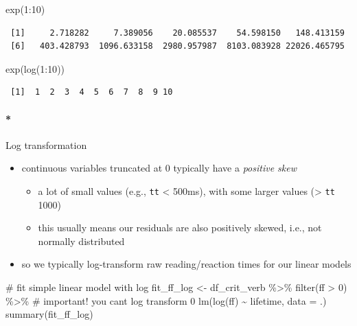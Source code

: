 \documentclass[
  letterpaper,
  DIV=11,
  numbers=noendperiod]{scrartcl}
\let\oldparagraph\paragraph
\renewcommand{\paragraph}[1]{\oldparagraph{#1}\mbox{}}
\newenvironment{Shaded}{\begin{snugshade}}{\end{snugshade}}
\newcommand{\AttributeTok}[1]{\textcolor[rgb]{0.40,0.45,0.13}{#1}}
\newcommand{\CommentTok}[1]{\textcolor[rgb]{0.37,0.37,0.37}{#1}}
\newcommand{\DecValTok}[1]{\textcolor[rgb]{0.68,0.00,0.00}{#1}}
\newcommand{\FunctionTok}[1]{\textcolor[rgb]{0.28,0.35,0.67}{#1}}
\newcommand{\NormalTok}[1]{\textcolor[rgb]{0.00,0.23,0.31}{#1}}
\newcommand{\OtherTok}[1]{\textcolor[rgb]{0.00,0.23,0.31}{#1}}
\newcommand{\SpecialCharTok}[1]{\textcolor[rgb]{0.37,0.37,0.37}{#1}}
\providecommand{\tightlist}{%
  \setlength{\itemsep}{0pt}\setlength{\parskip}{0pt}}\usepackage{longtable,booktabs,array}
\begin{document}
\begin{Shaded}
\begin{Highlighting}[]
\FunctionTok{exp}\NormalTok{(}\DecValTok{1}\SpecialCharTok{:}\DecValTok{10}\NormalTok{)}
\end{Highlighting}
\end{Shaded}

\begin{verbatim}
 [1]     2.718282     7.389056    20.085537    54.598150   148.413159
 [6]   403.428793  1096.633158  2980.957987  8103.083928 22026.465795
\end{verbatim}

\begin{Shaded}
\begin{Highlighting}[]
\FunctionTok{exp}\NormalTok{(}\FunctionTok{log}\NormalTok{(}\DecValTok{1}\SpecialCharTok{:}\DecValTok{10}\NormalTok{))}
\end{Highlighting}
\end{Shaded}

\begin{verbatim}
 [1]  1  2  3  4  5  6  7  8  9 10
\end{verbatim}

\hypertarget{log-transformation-1}{%
\paragraph*{Log transformation}\label{log-transformation-1}}

\begin{itemize}
\tightlist
\item
  continuous variables truncated at 0 typically have a \emph{positive
  skew}

  \begin{itemize}
  \tightlist
  \item
    a lot of small values (e.g., \texttt{tt} \textless{} 500ms), with
    some larger values (\textgreater{} \texttt{tt} 1000)
  \item
    this usually means our residuals are also positively skewed, i.e.,
    not normally distributed
  \end{itemize}
\item
  so we typically log-transform raw reading/reaction times for our
  linear models
\end{itemize}

\begin{Shaded}
\begin{Highlighting}[]
\CommentTok{\# fit simple linear model with log}
\NormalTok{fit\_ff\_log }\OtherTok{\textless{}{-}}\NormalTok{ df\_crit\_verb }\SpecialCharTok{\%\textgreater{}\%}
  \FunctionTok{filter}\NormalTok{(ff }\SpecialCharTok{\textgreater{}} \DecValTok{0}\NormalTok{) }\SpecialCharTok{\%\textgreater{}\%} \CommentTok{\# important! you can\textquotesingle{}t log transform 0}
  \FunctionTok{lm}\NormalTok{(}\FunctionTok{log}\NormalTok{(ff) }\SpecialCharTok{\textasciitilde{}}\NormalTok{ lifetime, }\AttributeTok{data =}\NormalTok{ .)}
\FunctionTok{summary}\NormalTok{(fit\_ff\_log)}
\end{Highlighting}
\end{Shaded}
\end{document}
